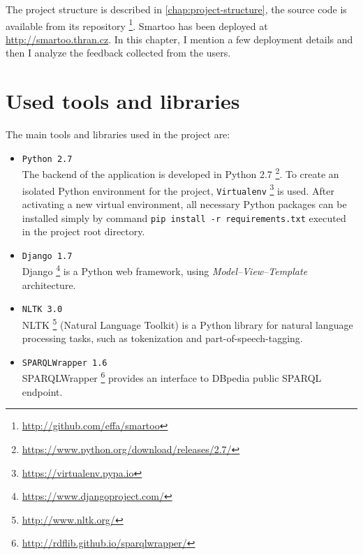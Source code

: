 \documentclass[12pt, twoside]{fithesis2}
\renewcommand{\_}{\leavevmode \kern0.07em\vbox{\hrule width0.4em}}
\newcommand{\squarebullet}{\textcolor{black}{\raisebox{0.15em}{\rule{4pt}{4pt}}}}
\newcommand{\emptysquarebullet}{\textcolor{black}{\raisebox{0.10em}{\tiny$\square$}}}
\newenvironment{myItemize}{
  \begin{itemize}[leftmargin=2em,rightmargin=1em,itemsep=\parskip ,parsep=0em,topsep=0em,partopsep=0em]
  \renewcommand{\labelitemi}{\squarebullet}
  \renewcommand{\labelitemii}{\textbullet}
}{
  \end{itemize}
}
\begin{document}
The project structure is described in \autoref{chap:project-structure},
the source code is available from its repository%
\footnote{\url{http://github.com/effa/smartoo}}.
Smartoo has been deployed at \url{http://smartoo.thran.cz}.
In this chapter, I mention a few deployment details
and then I analyze the feedback collected from the users.

\section{Used tools and libraries}
\label{sec:tools}

The main tools and libraries used in the project are:
\begin{myItemize}
\item \texttt{Python 2.7}\\
The backend of the application is developed in Python 2.7%
\footnote{\url{https://www.python.org/download/releases/2.7/}}.
To create an isolated Python environment for the project, \texttt{Virtualenv}%
\footnote{\url{https://virtualenv.pypa.io}} is used.
After activating a new virtual environment, all necessary Python packages can be installed simply by
command \texttt{pip install -r requirements.txt} executed in the project root directory.

\item \texttt{Django 1.7}\\
Django%
\footnote{\url{https://www.djangoproject.com/}}
is a Python web framework, using \emph{Model--View--Template} architecture.


\item \texttt{NLTK 3.0}\\
NLTK%
\footnote{\url{http://www.nltk.org/}}
(Natural Language Toolkit) is a Python library for natural language processing tasks,
such as tokenization and part-of-speech-tagging.

\item \texttt{SPARQLWrapper 1.6}\\
SPARQLWrapper%
\footnote{\url{http://rdflib.github.io/sparqlwrapper/}}
provides an interface to DBpedia public SPARQL endpoint.


\end{myItemize}
\end{document}
